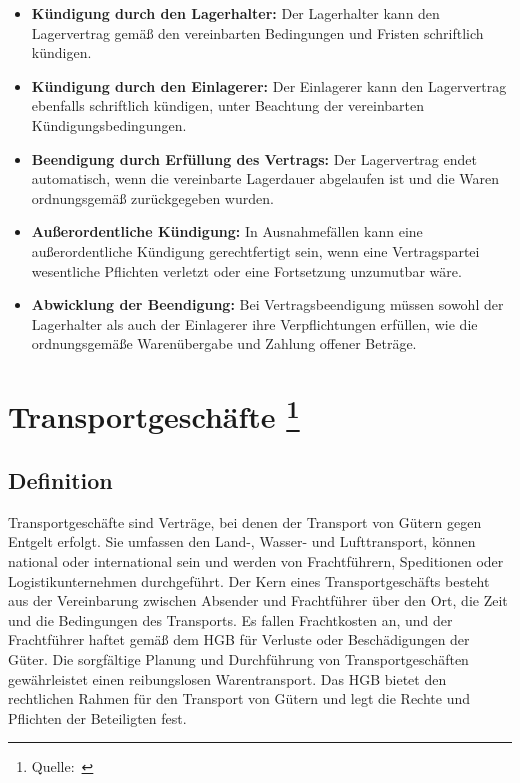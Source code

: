 \begin{itemize}
    \item \textbf{Kündigung durch den Lagerhalter:} Der Lagerhalter kann den Lagervertrag gemäß den vereinbarten Bedingungen und Fristen schriftlich kündigen.
    \item \textbf{Kündigung durch den Einlagerer:} Der Einlagerer kann den Lagervertrag ebenfalls schriftlich kündigen, unter Beachtung der vereinbarten Kündigungsbedingungen.
    \item \textbf{Beendigung durch Erfüllung des Vertrags:} Der Lagervertrag endet automatisch, wenn die vereinbarte Lagerdauer abgelaufen ist und die Waren ordnungsgemäß zurückgegeben wurden.
    \item \textbf{Außerordentliche Kündigung:} In Ausnahmefällen kann eine außerordentliche Kündigung gerechtfertigt sein, wenn eine Vertragspartei wesentliche Pflichten verletzt oder eine Fortsetzung unzumutbar wäre.
    \item \textbf{Abwicklung der Beendigung:} Bei Vertragsbeendigung müssen sowohl der Lagerhalter als auch der Einlagerer ihre Verpflichtungen erfüllen, wie die ordnungsgemäße Warenübergabe und Zahlung offener Beträge.
\end{itemize}





\chapter[Transportgeschäfte]{Transportgeschäfte \footnote{Quelle:~\cite{Handelsrecht}}}

\section{Definition}

Transportgeschäfte sind Verträge, bei denen der Transport von Gütern gegen Entgelt erfolgt. Sie umfassen den Land-, Wasser- und Lufttransport, können national oder international sein und werden von Frachtführern, Speditionen oder Logistikunternehmen durchgeführt. Der Kern eines Transportgeschäfts besteht aus der Vereinbarung zwischen Absender und Frachtführer über den Ort, die Zeit und die Bedingungen des Transports. Es fallen Frachtkosten an, und der Frachtführer haftet gemäß dem \ac{HGB} für Verluste oder Beschädigungen der Güter. Die sorgfältige Planung und Durchführung von Transportgeschäften gewährleistet einen reibungslosen Warentransport. Das HGB bietet den rechtlichen Rahmen für den Transport von Gütern und legt die Rechte und Pflichten der Beteiligten fest.



